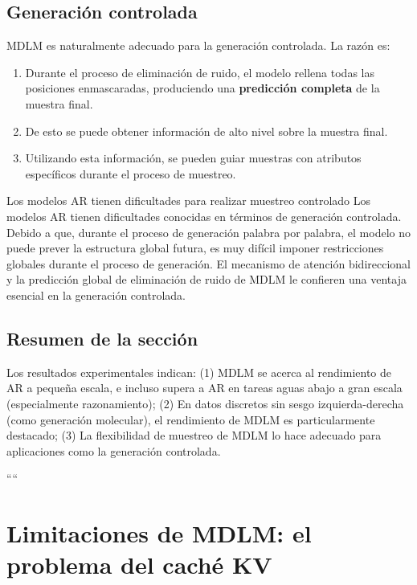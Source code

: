 \documentclass[a4paper]{article}
\begin{document}
\subsection{Generación controlada}

MDLM es naturalmente adecuado para la generación controlada. La razón es:

\begin{enumerate}
    \item Durante el proceso de eliminación de ruido, el modelo rellena todas las posiciones enmascaradas, produciendo una \textbf{predicción completa} de la muestra final.
    \item De esto se puede obtener información de alto nivel sobre la muestra final.
    \item Utilizando esta información, se pueden guiar muestras con atributos específicos durante el proceso de muestreo.
\end{enumerate}

\begin{warningbox}{Los modelos AR tienen dificultades para realizar muestreo controlado}
Los modelos AR tienen dificultades conocidas en términos de generación controlada. Debido a que, durante el proceso de generación palabra por palabra, el modelo no puede prever la estructura global futura, es muy difícil imponer restricciones globales durante el proceso de generación. El mecanismo de atención bidireccional y la predicción global de eliminación de ruido de MDLM le confieren una ventaja esencial en la generación controlada.
\end{warningbox}

\subsection{Resumen de la sección}

Los resultados experimentales indican: (1) MDLM se acerca al rendimiento de AR a pequeña escala, e incluso supera a AR en tareas aguas abajo a gran escala (especialmente razonamiento); (2) En datos discretos sin sesgo izquierda-derecha (como generación molecular), el rendimiento de MDLM es particularmente destacado; (3) La flexibilidad de muestreo de MDLM lo hace adecuado para aplicaciones como la generación controlada.

\newpage

````
\section{Limitaciones de MDLM: el problema del caché KV}
\end{document}

